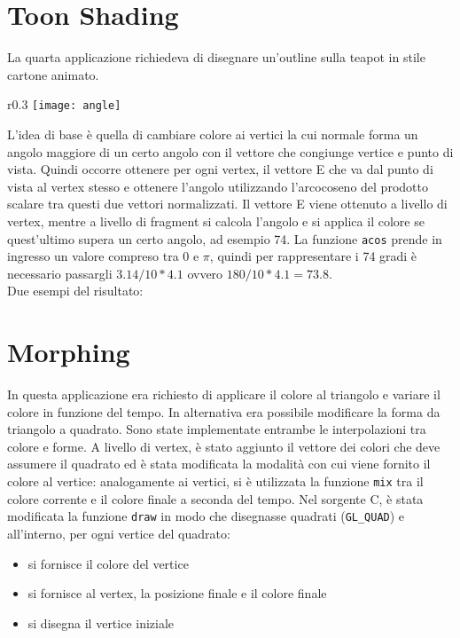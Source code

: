\section{Toon Shading}
La quarta applicazione richiedeva di disegnare un'outline sulla teapot in stile cartone animato.\\

\begin{wrapfigure}{r}{0.3\textwidth} %
    \centering
    \vspace{-0.5cm}
    \texttt{[image: angle]}
    \caption{\label{fig:angle}}
    \vspace{-0.3cm}
\end{wrapfigure}
L'idea di base è quella di cambiare colore ai vertici la cui normale forma un angolo maggiore di un certo angolo con il vettore che congiunge vertice e punto di vista. Quindi occorre ottenere per ogni vertex, il vettore E che va dal punto di vista al vertex stesso e ottenere l'angolo utilizzando l'arcocoseno del prodotto scalare tra questi due vettori normalizzati.
Il vettore E viene ottenuto a livello di vertex, mentre a livello di fragment si calcola l'angolo e si applica il colore se quest'ultimo supera un certo angolo, ad esempio 74\degree. La funzione \texttt{acos} prende in ingresso un valore compreso tra 0 e $\pi$, quindi per rappresentare i 74 gradi è necessario passargli $3.14/10*4.1$ ovvero $180/10*4.1=73.8$.\\

Due esempi del risultato:
\begin{figure}[hbt]
    \centering
    \vspace{-0.5cm}
	\vspace{-0.5cm}
\end{figure}

\section{Morphing}
In questa applicazione era richiesto di applicare il colore al triangolo e variare il colore in funzione del tempo. In alternativa era possibile modificare la forma da triangolo a quadrato. Sono state implementate entrambe le interpolazioni tra colore e forme. A livello di vertex, è stato aggiunto il vettore dei colori che deve assumere il quadrato ed è stata modificata la modalità con cui viene fornito il colore al vertice: analogamente ai vertici, si è utilizzata la funzione \texttt{mix} tra il colore corrente e il colore finale a seconda del tempo.
Nel sorgente C, è stata modificata la funzione \texttt{draw} in modo che disegnasse quadrati (\texttt{GL\_QUAD}) e all'interno, per ogni vertice del quadrato:
\begin{itemize}
  \item si fornisce il colore del vertice
  \item si fornisce al vertex, la posizione finale e il colore finale
  \item si disegna il vertice iniziale
\end{itemize}

